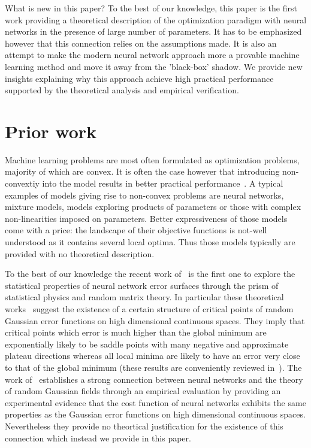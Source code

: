 \documentclass[twoside]{article}
\begin{document}
What is new in this paper? To the best of our knowledge, this paper is the first work providing a theoretical description of the optimization paradigm with neural networks in the presence of large number of parameters. It has to be emphasized however that this connection relies on the assumptions made. It is also an attempt to make the modern neural network approach more a provable machine learning method and move it away from the 'black-box' shadow. We provide new insights explaining why this approach achieve high practical performance supported by the theoretical analysis and empirical verification.

\section{Prior work}
\label{sec:PriorWork}

Machine learning problems are most often formulated as optimization problems, majority of which are convex. It is often the case however that introducing non-convextiy into the model results in better practical performance~\cite{Do:2012:RBM:2503308.2503355, Bengio+chapter2007}. A typical examples of models giving rise to non-convex problems are neural networks, mixture models, models exploring products of parameters or those with complex non-linearities imposed on parameters. Better expressiveness of those models come with a price: the landscape of their objective functions is not-well understood as it contains several local optima. Thus those models typically are provided with no theoretical description. 

To the best of our knowledge the recent work of~\cite{DBLP:journals/corr/DauphinPGCGB14} is the first one to explore the statistical properties of neural network error surfaces through the prism of statistical physics and random matrix theory. In particular these theoretical works~\cite{Bray2007,Fyodorov2007,Baldi:1989:NNP:70359.70362,wigner_semicircle} suggest the existence of a certain structure of critical points of random Gaussian error functions on high dimensional continuous spaces. They imply that critical points which error is much higher than the global minimum are exponentially likely to be saddle points with many negative and approximate plateau directions whereas all local minima are likely to have an error very close to that of the global minimum (these results are conveniently reviewed in~\cite{DBLP:journals/corr/DauphinPGCGB14}). The work of~\cite{DBLP:journals/corr/DauphinPGCGB14} establishes a strong connection between neural networks and the theory of random Gaussian fields through an empirical evaluation by providing an experimental evidence that the cost function of neural networks exhibits the same properties as the Gaussian error functions on high dimensional continuous spaces. Nevertheless they provide no theortical justification for the existence of this connection which instead we provide in this paper.
\end{document}
